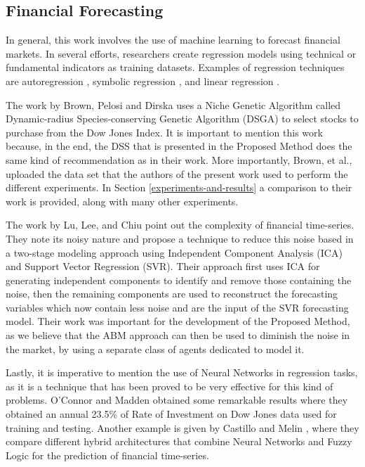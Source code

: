 \documentclass[review]{elsarticle}
\begin{document}
\subsection{Financial Forecasting}
\label{subsection:financial-forecasting}


In general, this work involves the use of machine learning to forecast financial
markets. In several efforts, researchers create regression models using
technical or fundamental indicators as training datasets. Examples of regression
techniques are autoregression \cite{burg1968new}, symbolic regression
\cite{billard2002symbolic}, and linear regression \cite{kutner2004applied}.

The work by Brown, Pelosi and Dirska \cite{brown2013dynamic} uses a Niche
Genetic Algorithm called Dynamic-radius Species-conserving Genetic Algorithm
(DSGA) to select stocks to purchase from the Dow Jones Index. It is important to
mention this work because, in the end, the DSS that is presented in the Proposed
Method does the same kind of recommendation as in their work. More importantly,
Brown, et al., uploaded the data set that the authors of the present work used to
perform the different experiments. In Section \ref{experiments-and-results} a
comparison to their work is provided, along with many other experiments.

The work by Lu, Lee, and Chiu \cite{Lu2009} point out the complexity of
financial time-series. They note its noisy nature and propose a technique to
reduce this noise based in a two-stage modeling approach using Independent
Component Analysis (ICA) and Support Vector Regression (SVR). Their approach
first uses ICA for generating independent components to identify and remove
those containing the noise, then the remaining components are used to
reconstruct the forecasting variables which now contain less noise and are the
input of the SVR forecasting model. Their work was important for the development
of the Proposed Method, as we believe that the ABM approach can then be used to
diminish the noise in the market, by using a separate class of agents dedicated
to model it.

Lastly, it is imperative to mention the use of Neural Networks in regression
tasks, as it is a technique that has been proved to be very effective for this
kind of problems. O'Connor and Madden \cite{Connor2005} obtained some remarkable
results where they obtained an annual 23.5\% of Rate of Investment on Dow Jones
data used for training and testing. Another example is given by Castillo and
Melin \cite{castillo2001simulation}, where they compare different hybrid
architectures that combine Neural Networks and Fuzzy Logic for the prediction of
financial time-series.
\end{document}
